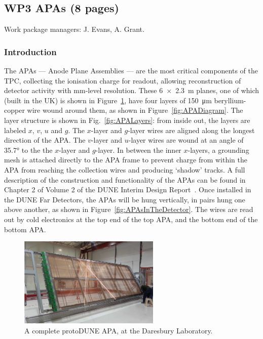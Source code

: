 \subsection{WP3 APAs (8 pages)}

Work package managers: J. Evans, A. Grant.

\subsubsection{Introduction}

The APAs --- Anode Plane Assemblies --- are the most critical components of the TPC, collecting the ionisation charge for readout, allowing reconstruction of detector activity with mm-level resolution. These \SI{6x 2.3}{\metre} planes, one of which (built in the UK) is shown in Figure~\ref{fig:CompleteAPA}, have four layers of \SI{150}{\micro\metre} beryllium-copper wire wound around them, as shown in Figure~\ref{fig:APADiagram}. The layer structure is shown in Fig.~\ref{fig:APALayers}: from inside out, the layers are labeled $x$, $v$, $u$ and $g$. The $x$-layer and $g$-layer wires are aligned along the longest direction of the APA. The $v$-layer and $u$-layer wires are wound at an angle of \ang{35.7} to the the $x$-layer and $g$-layer. In between the inner $x$-layers, a grounding mesh is attached directly to the APA frame to prevent charge from within the APA from reaching the collection wires and producing `shadow' tracks. A full description of the construction and functionality of the APAs can be found in Chapter 2 of Volume 2 of the DUNE Interim Design Report~\cite{ref:DUNEIDR}. Once installed in the DUNE Far Detectors, the APAs will be hung vertically, in pairs hung one above another, as shown in Figure~\ref{fig:APAsInTheDetector}. The wires are read out by cold electronics at the top end of the top APA, and the bottom end of the bottom APA.

\begin{figure}
    \centering
    \includegraphics[width=0.6\textwidth]{figs/WP3/UKAPA.png}
    \caption{A complete protoDUNE APA, at the Daresbury Laboratory.}
    \label{fig:CompleteAPA}
\end{figure}

